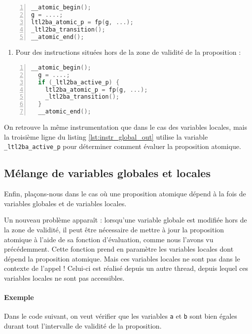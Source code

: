 \begin{lstlisting}[language=C, frame=single, numbers=left,
  caption=Instrumentation pour une variable globale dans la zone de validité]
__atomic_begin();
g = ....;
ltl2ba_atomic_p = fp(g, ...);
_ltl2ba_transition();
__atomic_end();
\end{lstlisting}

\begin{enumerate}
\def\labelenumi{\arabic{enumi})}
\setcounter{enumi}{1}
\item
  Pour des instructions situées hors de la zone de validité de la
  proposition :
\end{enumerate}

\begin{lstlisting}[language=C, frame=single, numbers=left, label=lst:instr_global_out,
  caption=Instrumentation pour une variable globale hors de la zone de validité]
  __atomic_begin();
  g = ....;
  if (_ltl2ba_active_p) {
    ltl2ba_atomic_p = fp(g, ...);
    _ltl2ba_transition();
  }
  __atomic_end();
\end{lstlisting}

On retrouve la même instrumentation que dans le cas des variables locales,
mais la troisième ligne du listing \ref{lst:instr_global_out} utilise la
variable \texttt{\_ltl2ba\_active\_p} pour déterminer comment évaluer la
proposition atomique.

\subsection{Mélange de variables globales et locales}

Enfin, plaçons-nous dans le cas où une proposition atomique dépend à la
fois de variables globales et de variables locales.

Un nouveau problème apparaît : lorsqu'une variable globale est modifiée
hors de la zone de validité, il peut être nécessaire de mettre à jour la
proposition atomique à l'aide de sa fonction d'évaluation, comme nous
l'avons vu précédemment. Cette fonction prend en paramètre les variables
locales dont dépend la proposition atomique. Mais ces variables locales
ne sont pas dans le contexte de l'appel ! Celui-ci est réalisé depuis un
autre thread, depuis lequel ces variables locales ne sont pas
accessibles.

\paragraph{Exemple}
Dans le code suivant, on veut vérifier que les variables \texttt{a} et
\texttt{b} sont bien égales durant tout l'intervalle de validité de la
proposition.

